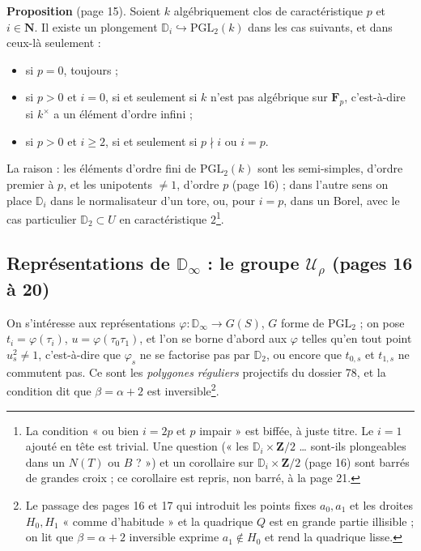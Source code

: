 \documentclass[11pt,a4paper]{article}
\begin{document}
\textbf{Proposition} (page 15). Soient $k$ algébriquement clos de
caractéristique $p$ et $i \in \mathbf{N}$. Il existe un plongement
$\mathbb{D}_i \hookrightarrow \mathrm{PGL}_2(k)$ dans les cas suivants, et
dans ceux-là seulement :
\begin{itemize}
  \item[a)] si $p = 0$, toujours ;
  \item[b)] si $p > 0$ et $i = 0$, si et seulement si $k$ n'est pas algébrique
    sur $\mathbf{F}_p$, c'est-à-dire si $k^\times$ a un élément d'ordre
    infini ;
  \item[c)] si $p > 0$ et $i \geq 2$, si et seulement si $p \nmid i$ ou $i =
    p$.
\end{itemize}
La raison : les éléments d'ordre fini de $\mathrm{PGL}_2(k)$ sont les
semi-simples, d'ordre premier à $p$, et les unipotents $\neq 1$, d'ordre $p$
(page 16) ; dans l'autre sens on place $\mathbb{D}_i$ dans le normalisateur
d'un tore, ou, pour $i = p$, dans un Borel, avec le cas particulier
$\mathbb{D}_2 \subset U$ en caractéristique $2$\footnote{La condition « ou
bien $i = 2p$ et $p$ impair » est biffée, à juste titre. Le $i = 1$ ajouté
en tête est trivial. Une question (« les $\mathbb{D}_i \times
\mathbf{Z}/2$ \ldots{} sont-ils plongeables dans un $N(T)$ ou $B$ ? ») et un
corollaire sur $\mathbb{D}_i \times \mathbf{Z}/2$ (page 16) sont barrés de
grandes croix ; ce corollaire est repris, non barré, à la page 21.}.

\subsection*{Représentations de $\mathbb{D}_\infty$ : le groupe $\mathcal{U}_\rho$ (pages 16 à 20)}

On s'intéresse aux représentations $\varphi : \mathbb{D}_\infty \to G(S)$,
$G$ forme de $\mathrm{PGL}_2$ ; on pose $t_i = \varphi(\tau_i)$, $u =
\varphi(\tau_0\tau_1)$, et l'on se borne d'abord aux $\varphi$ telles qu'en
tout point $u_s^2 \neq 1$, c'est-à-dire que $\varphi_s$ ne se factorise pas
par $\mathbb{D}_2$, ou encore que $t_{0,s}$ et $t_{1,s}$ ne commutent pas. Ce
sont les \emph{polygones réguliers} projectifs du dossier 78, et la condition
dit que $\beta = \alpha + 2$ est inversible\footnote{Le passage des pages 16
et 17 qui introduit les points fixes $a_0, a_1$ et les droites $H_0, H_1$ « comme
d'habitude » et la quadrique $Q$ est en grande partie illisible ; on lit que
$\beta = \alpha + 2$ inversible exprime $a_1 \notin H_0$ et rend la quadrique
lisse.}.
\end{document}
